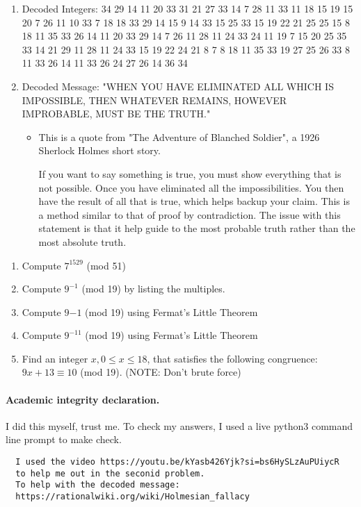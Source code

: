 \documentclass[11pt]{article}
\newcounter{prnum}
\newenvironment{problem}{{\vskip 0.2in\noindent\bf Problem
       \addtocounter{prnum}{1} \arabic{prnum}.}}{\vskip 0.1in}
\begin{document}
\begin{problem}
\begin{enumerate}
      \pagebreak
    \item Decoded Integers: 34 29 14 11 20 33 31 21 27 33 14 7 28 11 33 11 18 15 19 15 20 7 26 
      11 10 33 7 18 18 33 29 14 15 9 14 33 15 25 33 15 19 22 21 25 25 15 8 18 11 35 33 26 
      14 11 20 33 29 14 7 26 11 28 11 24 33 24 11 19 7 15 20 25 35 33 14 21 29 11 28 11 24 33 
      15 19 22 24 21 8 7 8 18 11 35 33 19 27 25 26 33 8 11 33 26 14 11 33 26 24 27 26 14 36 34  
    \item Decoded Message: "WHEN YOU HAVE ELIMINATED ALL 
      WHICH IS IMPOSSIBLE, THEN WHATEVER REMAINS, HOWEVER IMPROBABLE, MUST BE THE TRUTH." 
      \begin{itemize}
        \item This is a quote from "The Adventure of Blanched Soldier", 
          a 1926 Sherlock Holmes short story.

          If you want to say something is true, you must show everything that is
          not possible. Once you have eliminated all the impossibilities.
          You then have the result of all that is true, which helps backup your claim.
          This is a method similar to that of proof by contradiction.
          The issue with this statement is that 
          it help guide to the most probable truth rather than
          the most absolute truth.
      \end{itemize}
  \end{enumerate}
\end{problem}

\clearpage

\begin{problem}
  \begin{enumerate}
    \item Compute $7^{1529}$ (mod 51)
    \item Compute $9^{-1}$ (mod 19) by listing the multiples.
    \item Compute $9{-1}$ (mod 19) using Fermat's Little Theorem
    \item Compute $9^{-11}$ (mod 19) using Fermat's Little Theorem
    \item Find an integer $x, 0 \leq x \leq 18$, that satisfies
      the following congruence: $9x + 13 \equiv 10$ (mod 19). (NOTE: Don't brute force)
  \end{enumerate}
\end{problem}


\vskip 0.2in
\paragraph{Academic integrity declaration.}
I did this myself, trust me. To check my answers, I used a live python3 command line prompt to make check.
\begin{verbatim}
  I used the video https://youtu.be/kYasb426Yjk?si=bs6HySLzAuPUiycR 
  to help me out in the seconid problem.
  To help with the decoded message:
  https://rationalwiki.org/wiki/Holmesian_fallacy
\end{verbatim}
\end{document}

